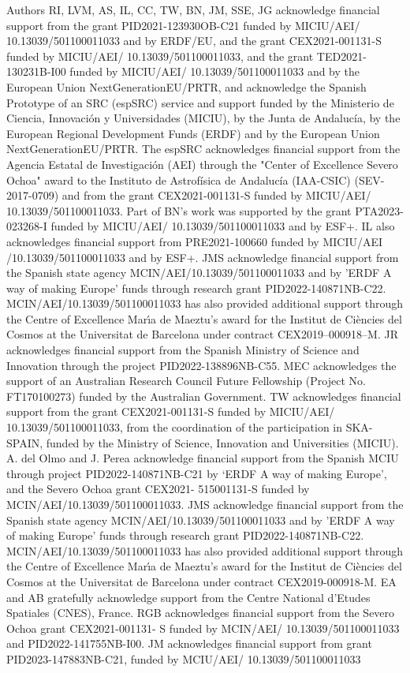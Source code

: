 \documentclass{aa}
\begin{document}
\begin{acknowledgements}
Authors RI, LVM, AS, IL, CC, TW, BN, JM, SSE, JG acknowledge financial support from the grant PID2021-123930OB-C21 funded by MICIU/AEI/ 10.13039/501100011033 and by ERDF/EU, and the grant CEX2021-001131-S funded by MICIU/AEI/ 10.13039/501100011033, and the grant TED2021-130231B-I00 funded by MICIU/AEI/ 10.13039/501100011033 and by the European Union NextGenerationEU/PRTR, and acknowledge the Spanish Prototype of an SRC (espSRC) service and support funded by the Ministerio de Ciencia, Innovación y Universidades (MICIU), by the Junta de Andalucía, by the European Regional Development Funds (ERDF) and by the European Union NextGenerationEU/PRTR. The espSRC acknowledges financial support from the Agencia Estatal de Investigación (AEI) through the "Center of Excellence Severo Ochoa" award to the Instituto de Astrofísica de Andalucía (IAA-CSIC) (SEV-2017-0709) and from the grant CEX2021-001131-S funded by MICIU/AEI/ 10.13039/501100011033. Part of BN's work was supported by the grant PTA2023-023268-I funded by MICIU/AEI/ 10.13039/501100011033 and by ESF+. IL also acknowledges financial support from 
PRE2021-100660 funded by MICIU/AEI /10.13039/501100011033 and by ESF+. JMS acknowledge financial support from the Spanish state agency MCIN/AEI/10.13039/501100011033 and by 'ERDF A way of making Europe' funds through research grant PID2022-140871NB-C22. MCIN/AEI/10.13039/501100011033 has also provided additional support through the Centre of Excellence Mar\'\i a de Maeztu's award for the Institut de Ci\`encies del Cosmos at the Universitat de Barcelona under contract CEX2019–000918–M. JR acknowledges financial support from the Spanish Ministry of Science and Innovation through the project PID2022-138896NB-C55. MEC acknowledges the support of an Australian Research Council Future Fellowship (Project No. FT170100273) funded by the Australian Government. TW acknowledges financial support from the grant CEX2021-001131-S funded by MICIU/AEI/ 10.13039/501100011033, from the coordination of the participation in SKA-SPAIN, funded by the Ministry of Science, Innovation and Universities (MICIU). A. del Olmo and J. Perea acknowledge financial support from the Spanish MCIU through project PID2022-140871NB-C21 by ‘ERDF A way of making Europe’, and the Severo Ochoa grant CEX2021- 515001131-S funded by MCIN/AEI/10.13039/501100011033. JMS acknowledge financial support from the Spanish state agency MCIN/AEI/10.13039/501100011033 and by 'ERDF A way of making Europe' funds through research grant PID2022-140871NB-C22. MCIN/AEI/10.13039/501100011033 has also provided additional support through the Centre of Excellence Mar\'\i a de Maeztu's award for the Institut de Ci\`encies del Cosmos at the Universitat de Barcelona under contract CEX2019-000918-M. EA and AB gratefully acknowledge support from the Centre National d’Etudes Spatiales (CNES), France. RGB acknowledges financial support from the Severo Ochoa grant CEX2021-001131- S funded by MCIN/AEI/ 10.13039/501100011033 and PID2022-141755NB-I00. JM acknowledges financial support from  grant PID2023-147883NB-C21, funded by MCIU/AEI/ 10.13039/501100011033


\end{acknowledgements}
\end{document}
